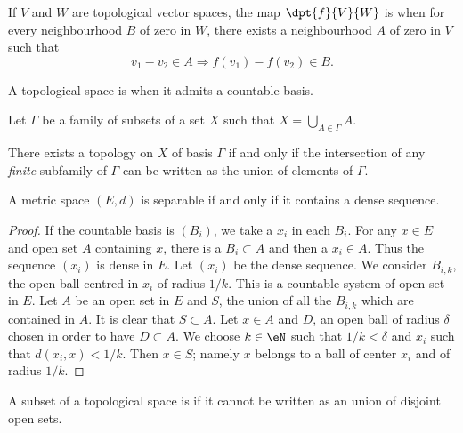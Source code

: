 \begin{definition}

If $V$ and $W$ are topological vector spaces, the map $\dpt{f}{V}{W}$ is  when for every neighbourhood $B$ of zero in $W$, there exists a neighbourhood $A$ of zero in $V$ such that
\[
  v_1-v_2\in A\Rightarrow f(v_1)-f(v_2)\in B.
\]
 \label{def:unif_cont}
\end{definition}


\begin{definition}
A topological space is  when it admits a countable basis.
\end{definition}

\begin{lemma}
Let $\Gamma$ be a family of subsets of a set $X$ such that $X=\bigcup_{A\in\Gamma}A$.

There exists a topology on $X$ of basis $\Gamma$ if and only if the intersection of any \emph{finite} subfamily of $\Gamma$ can be written as the union of elements of $\Gamma$.
\label{lem:topo_base}
\end{lemma}

\begin{lemma}
A metric space $(E,d)$ is separable if and only if it contains a dense sequence.
\label{lem:sep_metric}
\end{lemma}

\begin{proof}
 If the countable basis is $(B_i)$, we take a $x_i$ in each $B_i$. For any $x\in E$ and open set $A$ containing $x$, there is a $B_i\subset A$ and then a $x_i\in A$. Thus the sequence $(x_i)$ is dense in $E$.
Let $(x_i)$ be the dense sequence. We consider $B_{i,k}$, the open ball centred in $x_i$ of radius $1/k$. This is a countable system of open set in $E$. Let $A$ be an open set in $E$ and $S$, the union of all the $B_{i,k}$ which are contained in $A$. It is clear that $S\subset A$. Let $x\in A$ and $D$, an open ball of radius $\delta$ chosen in order to have $D\subset A$. We choose $k\in\eN$ such that $1/k<\delta$ and $x_i$ such that $d(x_i,x)<1/k$. Then $x\in S$; namely $x$ belongs to a ball of center $x_i$ and of radius $1/k$.
\end{proof}

\begin{definition}
A subset of a topological space is  if it cannot be written as an union of disjoint open sets.
\end{definition}

